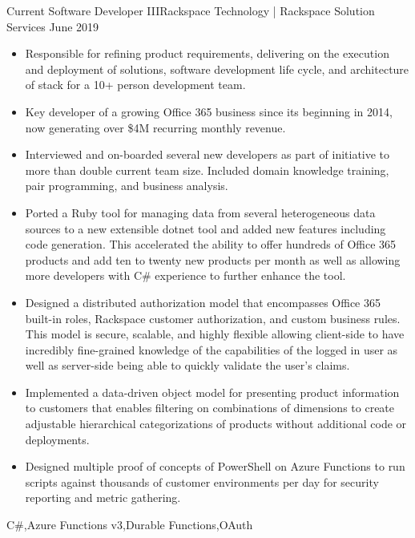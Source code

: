 \begin{experiences}
  \experience
    {Current}       {Software Developer III}{Rackspace Technology | Rackspace Solution Services}
    {June 2019}     {
                      \begin{itemize}
                        \item Responsible for refining product requirements, delivering on the execution and deployment of solutions, software development life cycle, and architecture of stack for a 10+ person development team.
                        \item Key developer of a growing Office 365 business since its beginning in 2014, now generating over \$4M recurring monthly revenue.
                        \item Interviewed and on-boarded several new developers as part of initiative to more than double current team size. Included domain knowledge training, pair programming, and business analysis.
                        \item Ported a Ruby tool for managing data from several heterogeneous data sources to a new extensible dotnet tool and added new features including code generation. This accelerated the ability to offer hundreds of Office 365 products and add ten to twenty new products per month as well as allowing more developers with C\# experience to further enhance the tool.
                        \item Designed a distributed authorization model that encompasses Office 365 built-in roles, Rackspace customer authorization, and custom business rules. This model is secure, scalable, and highly flexible allowing client-side to have incredibly fine-grained knowledge of the capabilities of the logged in user as well as server-side being able to quickly validate the user's claims.
                        \item Implemented a data-driven object model for presenting product information to customers that enables filtering on combinations of dimensions to create adjustable hierarchical categorizations of products without additional code or deployments.
                        \item Designed multiple proof of concepts of PowerShell on Azure Functions to run scripts against thousands of customer environments per day for security reporting and metric gathering.
                      \end{itemize}
                    }
                    {C\#,Azure Functions v3,Durable Functions,OAuth}

\end{experiences}
